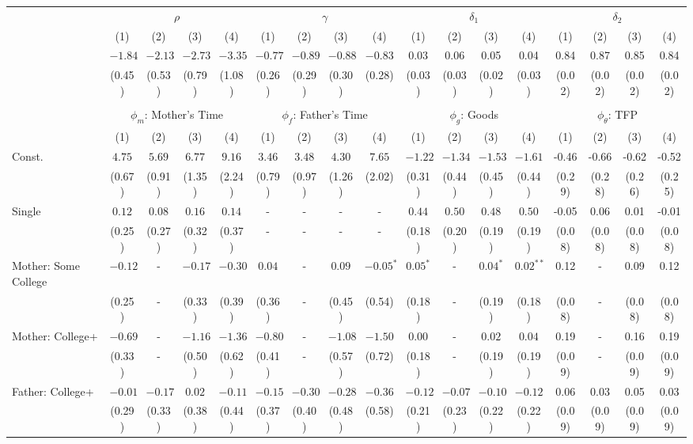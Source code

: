 \begin{tabular}{lcccccccccccccccc}\\\toprule
 & \multicolumn{4}{c}{$\rho$} & \multicolumn{4}{c}{$\gamma$} & \multicolumn{4}{c}{$\delta_{1}$} & \multicolumn{4}{c}{$\delta_{2}$} \\
&(1)&(2)&(3)&(4)&(1)&(2)&(3)&(4)&(1)&(2)&(3)&(4)&(1)&(2)&(3)&(4)\\\cmidrule(r){2-5}\cmidrule(r){6-9}\cmidrule(r){10-13}\cmidrule(r){14-17}
&$-1.84$&$-2.13$&$-2.73$&$-3.35$&$-0.77$&$-0.89$&$-0.88$&$-0.83$&0.03&0.06&0.05&0.04&0.84&0.87&0.85&0.84\\
&(0.45)&(0.53)&(0.79)&(1.08)&(0.26)&(0.29)&(0.30)&(0.28)&(0.03)&(0.03)&(0.02)&(0.03)&(0.02)&(0.02)&(0.02)&(0.02)\\
&&&&&&&&&&&&&&&&\\
 & \multicolumn{4}{c}{$\phi_{m}$: Mother's Time} & \multicolumn{4}{c}{$\phi_{f}$: Father's Time} & \multicolumn{4}{c}{$\phi_{g}$: Goods} & \multicolumn{4}{c}{$\phi_{\theta}$: TFP} \\
&(1)&(2)&(3)&(4)&(1)&(2)&(3)&(4)&(1)&(2)&(3)&(4)&(1)&(2)&(3)&(4)\\\cmidrule(r){2-5}\cmidrule(r){6-9}\cmidrule(r){10-13}\cmidrule(r){14-17}
Const.&$4.75$&$5.69$&$6.77$&$9.16$&$3.46$&$3.48$&$4.30$&$7.65$&$-1.22$&$-1.34$&$-1.53$&$-1.61$&-0.46&-0.66&-0.62&-0.52\\
&(0.67)&(0.91)&(1.35)&(2.24)&(0.79)&(0.97)&(1.26)&(2.02)&(0.31)&(0.44)&(0.45)&(0.44)&(0.29)&(0.28)&(0.26)&(0.25)\\
Single&$0.12$&$0.08$&$0.16$&$0.14$&-&-&-&-&$0.44$&$0.50$&$0.48$&$0.50$&-0.05&0.06&0.01&-0.01\\
&(0.25)&(0.27)&(0.32)&(0.37)&-&-&-&-&(0.18)&(0.20)&(0.19)&(0.19)&(0.08)&(0.08)&(0.08)&(0.08)\\
Mother: Some College&$-0.12$&-&$-0.17$&$-0.30$&$0.04$&-&$0.09$&$-0.05^{*}$&$0.05^{*}$&-&$0.04^{*}$&$0.02^{**}$&0.12&-&0.09&0.12\\
&(0.25)&-&(0.33)&(0.39)&(0.36)&-&(0.45)&(0.54)&(0.18)&-&(0.19)&(0.18)&(0.08)&-&(0.08)&(0.08)\\
Mother: College+&$-0.69$&-&$-1.16$&$-1.36$&$-0.80$&-&$-1.08$&$-1.50$&$0.00$&-&$0.02$&$0.04$&0.19&-&0.16&0.19\\
&(0.33)&-&(0.50)&(0.62)&(0.41)&-&(0.57)&(0.72)&(0.18)&-&(0.19)&(0.19)&(0.09)&-&(0.09)&(0.09)\\
Father: College+&$-0.01$&$-0.17$&$0.02$&$-0.11$&$-0.15$&$-0.30$&$-0.28$&$-0.36$&$-0.12$&$-0.07$&$-0.10$&$-0.12$&0.06&0.03&0.05&0.03\\
&(0.29)&(0.33)&(0.38)&(0.44)&(0.37)&(0.40)&(0.48)&(0.58)&(0.21)&(0.23)&(0.22)&(0.22)&(0.09)&(0.09)&(0.09)&(0.09)\\

\end{tabular}
